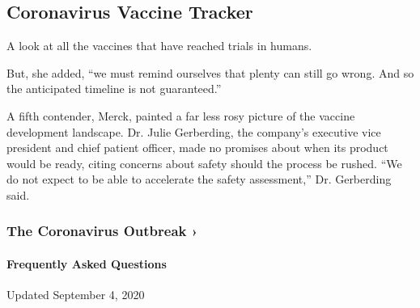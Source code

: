 \hypertarget{coronavirus-vaccine-tracker}{%
\subsection{Coronavirus Vaccine
Tracker}\label{coronavirus-vaccine-tracker}}

A look at all the vaccines that have reached trials in humans.

But, she added, ``we must remind ourselves that plenty can still go
wrong. And so the anticipated timeline is not guaranteed.''

A fifth contender, Merck, painted a far less rosy picture of the vaccine
development landscape. Dr. Julie Gerberding, the company's executive
vice president and chief patient officer, made no promises about when
its product would be ready, citing concerns about safety should the
process be rushed. ``We do not expect to be able to accelerate the
safety assessment,'' Dr. Gerberding said.

\href{https://www.nytimes3xbfgragh.onion/news-event/coronavirus?action=click\&pgtype=Article\&state=default\&region=MAIN_CONTENT_3\&context=storylines_faq}{}

\hypertarget{the-coronavirus-outbreak-}{%
\subsubsection{The Coronavirus Outbreak
›}\label{the-coronavirus-outbreak-}}

\hypertarget{frequently-asked-questions}{%
\paragraph{Frequently Asked
Questions}\label{frequently-asked-questions}}

Updated September 4, 2020

